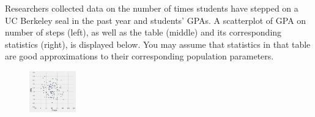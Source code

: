 \question Researchers collected data on the number of times students have
stepped on a UC Berkeley seal in the past year and students’ GPAs. A
scatterplot of GPA on number of steps (left), as well as the table 
(middle) and its corresponding statistics (right), is displayed below. You may
assume that statistics in that table are good approximations to their
corresponding population parameters.

\begin{figure}[h!]
\begin{floatrow}
\includegraphics[width=0.18\textwidth]{figs/steps_and_gpa.png}
\end{floatrow}
\end{figure}

